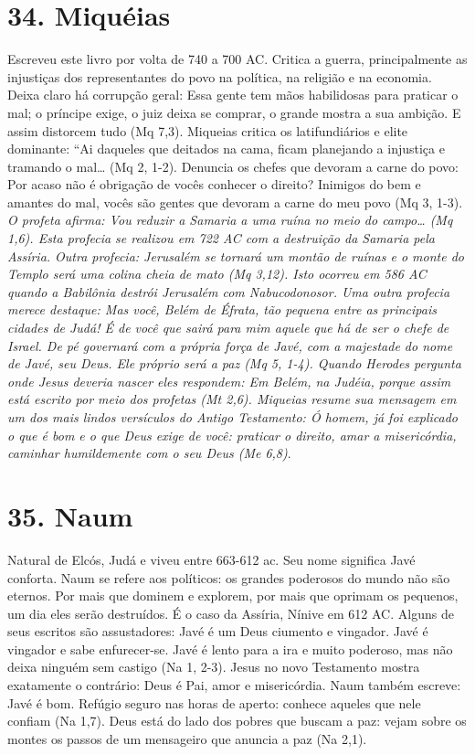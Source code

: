 \documentclass[
]{book}
\begin{document}
\hypertarget{miquuxe9ias}{%
\section*{34. Miquéias}\label{miquuxe9ias}}

Escreveu este livro por volta de 740 a 700 AC. Critica a guerra, principalmente as injustiças dos representantes do povo na política, na religião e na economia. Deixa claro há corrupção geral: Essa gente tem mãos habilidosas para praticar o mal; o príncipe exige, o juiz deixa se comprar, o grande mostra a sua ambição. E assim distorcem tudo (Mq 7,3). Miqueias critica os latifundiários e elite dominante: ``Ai daqueles que deitados na cama, ficam planejando a injustiça e tramando o mal\ldots{} (Mq 2, 1-2). Denuncia os chefes que devoram a carne do povo: Por acaso não é obrigação de vocês conhecer o direito? Inimigos do bem e amantes do mal, vocês são gentes que devoram a carne do meu povo (Mq 3, 1-3). \emph{O profeta afirma: Vou reduzir a Samaria a uma ruína no meio do campo\ldots{} (Mq 1,6). Esta profecia se realizou em 722 AC com a destruição da Samaria pela Assíria. Outra profecia: Jerusalém se tornará um montão de ruínas e o monte do Templo será uma colina cheia de mato (Mq 3,12). Isto ocorreu em 586 AC quando a Babilônia destrói Jerusalém com Nabucodonosor. Uma outra profecia merece destaque: Mas você, Belém de Éfrata, tão pequena entre as principais cidades de Judá! É de você que sairá para mim aquele que há de ser o chefe de Israel. De pé governará com a própria força de Javé, com a majestade do nome de Javé, seu Deus. Ele próprio será a paz (Mq 5, 1-4). Quando Herodes pergunta onde Jesus deveria nascer eles respondem: Em Belém, na Judéia, porque assim está escrito por meio dos profetas (Mt 2,6). Miqueias resume sua mensagem em um dos mais lindos versículos do Antigo Testamento: Ó homem, já foi explicado o que é bom e o que Deus exige de você: praticar o direito, amar a misericórdia, caminhar humildemente com o seu Deus (Me 6,8)}.

\hypertarget{naum}{%
\section*{35. Naum}\label{naum}}

Natural de Elcós, Judá e viveu entre 663-612 ac. Seu nome significa Javé conforta. Naum se refere aos políticos: os grandes poderosos do mundo não são eternos. Por mais que dominem e explorem, por mais que oprimam os pequenos, um dia eles serão destruídos. É o caso da Assíria, Nínive em 612 AC. Alguns de seus escritos são assustadores: Javé é um Deus ciumento e vingador. Javé é vingador e sabe enfurecer-se. Javé é lento para a ira e muito poderoso, mas não deixa ninguém sem castigo (Na 1, 2-3). Jesus no novo Testamento mostra exatamente o contrário: Deus é Pai, amor e misericórdia. Naum também escreve: Javé é bom. Refúgio seguro nas horas de aperto: conhece aqueles que nele confiam (Na 1,7). Deus está do lado dos pobres que buscam a paz: vejam sobre os montes os passos de um mensageiro que anuncia a paz (Na 2,1).
\end{document}
